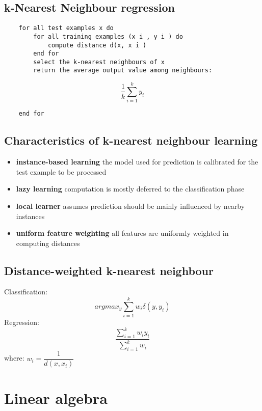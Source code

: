 \documentclass[a4paper, 10pt, titlepage]{article}
\begin{document}
\subsection{k-Nearest Neighbour regression}
\begin{lstlisting}
	for all test examples x do
		for all training examples (x i , y i ) do
			compute distance d(x, x i )
		end for
		select the k-nearest neighbours of x
		return the average output value among neighbours:
\end{lstlisting}
$$\dfrac{1}{k} \sum_{i=1}^{k}y_i$$
\begin{lstlisting}
	end for
\end{lstlisting}

\subsection{Characteristics of k-nearest neighbour learning}
\begin{itemize}
\item \textbf{instance-based learning} the model used for prediction is calibrated for the test example to be processed
\item \textbf{lazy learning} computation is mostly deferred to the classification phase
\item \textbf{local learner} assumes prediction should be mainly influenced by nearby instances
\item \textbf{uniform feature weighting} all features are uniformly weighted in computing distances
\end{itemize}

\subsection{Distance-weighted k-nearest neighbour}
Classification:
$$argmax_y \sum_{i=1}^{k} w_i \delta(y,y_i)$$
Regression:
$$\dfrac{\sum_{i=1}^{k}w_i y_i}{\sum_{i=1}^{k} w_i}$$
where: $w_i = \dfrac{1}{d(x,x_i)}$
\newpage

\section{Linear algebra}
\end{document}

